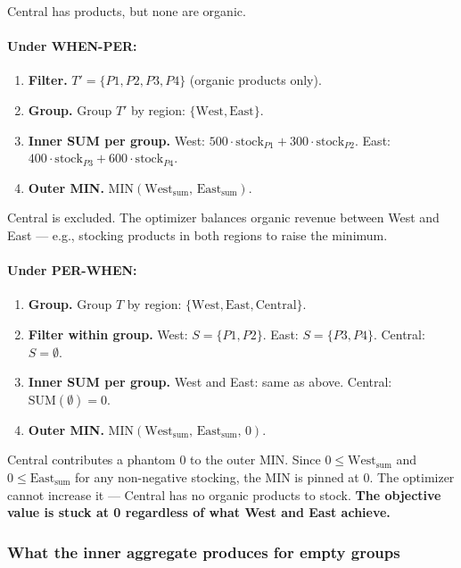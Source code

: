\documentclass[11pt]{article}
\begin{document}
Central has products, but none are organic.

\paragraph{Under WHEN-PER:}
\begin{enumerate}[leftmargin=2em]
    \item \textbf{Filter.} $T' = \{P1, P2, P3, P4\}$ (organic products only).
    \item \textbf{Group.} Group $T'$ by region: $\{\text{West}, \text{East}\}$.
    \item \textbf{Inner SUM per group.}
        West: $500 \cdot \text{stock}_{P1} + 300 \cdot \text{stock}_{P2}$.
        East: $400 \cdot \text{stock}_{P3} + 600 \cdot \text{stock}_{P4}$.
    \item \textbf{Outer MIN.} $\text{MIN}(\text{West}_{\text{sum}},\, \text{East}_{\text{sum}})$.
\end{enumerate}
Central is excluded. The optimizer balances organic revenue between West and
East --- e.g., stocking products in both regions to raise the minimum.

\paragraph{Under PER-WHEN:}
\begin{enumerate}[leftmargin=2em]
    \item \textbf{Group.} Group $T$ by region: $\{\text{West}, \text{East}, \text{Central}\}$.
    \item \textbf{Filter within group.}
        West: $S = \{P1, P2\}$.
        East: $S = \{P3, P4\}$.
        Central: $S = \emptyset$.
    \item \textbf{Inner SUM per group.}
        West and East: same as above.
        Central: $\text{SUM}(\emptyset) = 0$.
    \item \textbf{Outer MIN.} $\text{MIN}(\text{West}_{\text{sum}},\, \text{East}_{\text{sum}},\, 0)$.
\end{enumerate}
Central contributes a phantom 0 to the outer MIN. Since
$0 \leq \text{West}_{\text{sum}}$ and $0 \leq \text{East}_{\text{sum}}$ for
any non-negative stocking, the MIN is pinned at 0. The optimizer cannot
increase it --- Central has no organic products to stock. \textbf{The
objective value is stuck at 0 regardless of what West and East achieve.}

\subsubsection*{What the inner aggregate produces for empty groups}
\end{document}
